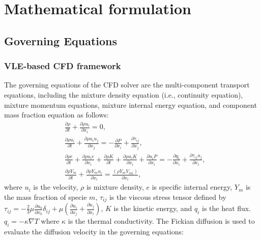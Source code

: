 \chapter{Mathematical formulation}
\label{math_chapter}

\section{Governing Equations}
\subsection{VLE-based CFD framework}
\label{sec:model:cfd}
The governing equations of the CFD solver are the multi-component transport equations, including the mixture density equation (i.e., continuity equation), mixture momentum equations, mixture internal energy equation, and component mass fraction equation as follows:
\begin{align}
 &\frac{\partial \rho}{\partial t}+\frac{\partial \rho u_i}{\partial x_i}=0 \label{Gc},\\
 &\frac{\partial \rho u_i}{\partial t}+\frac{\partial \rho u_i u_j}{\partial x_j}=-\frac{\partial P}{\partial x_i}+\frac{\partial \tau_{ij}}{\partial x_j} \label{Gm},\\
 &\frac{\partial \rho e}{\partial t}+\frac{\partial \rho u_i e}{\partial x_i}+\frac{\partial \rho K}{\partial t}+\frac{\partial \rho u_i K}{\partial x_i}+\frac{\partial  u_i P}{\partial x_i}=-\frac{\partial q_i}{\partial x_i} +\frac{\partial \tau_{ij}u_j}{\partial x_i},\\
  &\frac{\partial \rho Y_m}{\partial t}+\frac{\partial \rho Y_m u_i}{\partial x_i}=\frac{\left(\rho Y_m V_{mi}\right)}{\partial x_i},
\end{align}
where $u_i$ is the velocity, $\rho$ is mixture density, $e$ is specific internal energy, $Y_m$ is the mass fraction of specie $m$, $\tau_{ij}$ is the viscous stress tensor defined by $ \tau_{ij} = -\frac{2}{3}\mu\frac{\partial u_k}{\partial x_k}\delta_{ij} + \mu \left( \frac{\partial u_i}{\partial x_j} +\frac{\partial u_j}{\partial x_i}\right) $, $K$ is the kinetic energy, and $q_i$ is the heat flux. $q_i = -\kappa \nabla  T$ where $\kappa$ is the thermal conductivity. 
The Fickian diffusion is used to evaluate the diffusion velocity in the governing equations:

